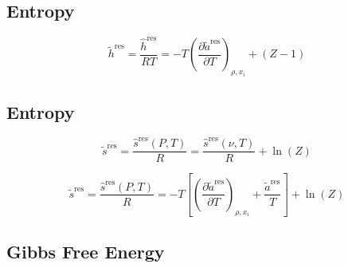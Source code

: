 \documentclass[12pt, letterpaper]{article}
\begin{document}
\subsection{Entropy}


\begin{equation}
    \tilde{h}^{\mathrm{res}} = \frac{\hat{h}^{\mathrm{res}}}{RT}=-T\left(\frac{\partial\tilde{a}^{\mathrm{res}}}{\partial T}\right)_{\rho,x_{i}}+(Z-1)
    \label{eq:h_res}
\end{equation}

\subsection{Entropy}


\begin{equation}
    \tilde{s}^{\mathrm{res}} = \frac{\hat{s}^{\mathrm{res}}(P,T)}{R}=\frac{\hat{s}^{\mathrm{res}}(\nu,T)}{R}+\ln(Z)
    \label{eq:s_res_from_s_vol}
\end{equation}


\begin{equation}
    \tilde{s}^{\mathrm{res}} = \frac{\hat{s}^{\mathrm{res}}(P,T)}{R}=-T\left[\left(\frac{\partial\tilde{a}^{\mathrm{res}}}{\partial T}\right)_{\rho,x_{i}}+\frac{\tilde{a}^{\mathrm{res}}}{T}\right]+\ln(Z)
    \label{eq:s_res}
\end{equation}

\subsection{Gibbs Free Energy}

\end{document}
